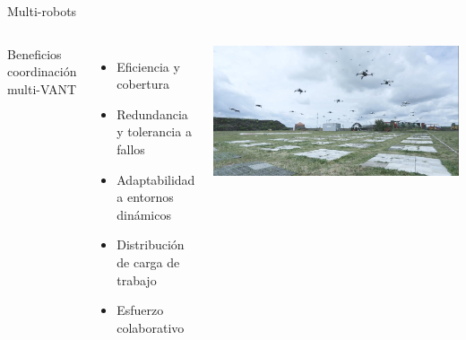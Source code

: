 \documentclass[
	12pt, %
	aspectratio=169, %
]{beamer}
\begin{document}
\begin{frame}{Multi-robots}
  \begin{columns}
    Beneficios coordinación multi-VANT
    \begin{itemize}
    \item Eficiencia y cobertura
    \item Redundancia y tolerancia a fallos
    \item Adaptabilidad a entornos dinámicos
    \item Distribución de carga de trabajo
    \item Esfuerzo colaborativo
    \end{itemize}
    \includegraphics[width=\textwidth]{drone_swarm}
  \end{columns}
\end{frame}

\end{document}
